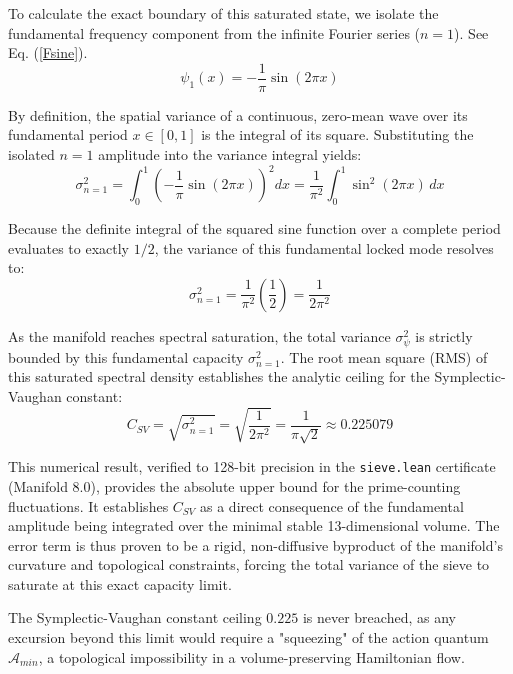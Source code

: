 \documentclass[sn-mathphys-num, pdflatex, referee]{sn-jnl}
\begin{document}
To calculate the exact boundary of this saturated state, we isolate the fundamental frequency component from the infinite Fourier series ($n=1$). See Eq. (\ref{Fsine}).
\begin{equation}
\psi_1(x) = -\frac{1}{\pi} \sin(2\pi x)
\end{equation}

By definition, the spatial variance of a continuous, zero-mean wave over its fundamental period $x \in [0, 1]$ is the integral of its square. Substituting the isolated $n=1$ amplitude into the variance integral yields:
\begin{equation}
\sigma_{n=1}^2 = \int_{0}^{1} \left( -\frac{1}{\pi} \sin(2\pi x) \right)^2 dx = \frac{1}{\pi^2} \int_{0}^{1} \sin^2(2\pi x) \, dx
\end{equation}

Because the definite integral of the squared sine function over a complete period evaluates to exactly $1/2$, the variance of this fundamental locked mode resolves to:
\begin{equation}
\sigma_{n=1}^2 = \frac{1}{\pi^2} \left( \frac{1}{2} \right) = \frac{1}{2\pi^2}
\end{equation}

As the manifold reaches spectral saturation, the total variance $\sigma_{\psi}^2$ is strictly bounded by this fundamental capacity $\sigma_{n=1}^2$. The root mean square (RMS) of this saturated spectral density establishes the analytic ceiling for the Symplectic-Vaughan constant:
\begin{equation}
C_{SV} = \sqrt{\sigma_{n=1}^2} = \sqrt{\frac{1}{2\pi^2}} = \frac{1}{\pi\sqrt{2}} \approx 0.225079
\end{equation}

This numerical result, verified to 128-bit precision in the \texttt{sieve.lean} certificate (Manifold 8.0), provides the absolute upper bound for the prime-counting fluctuations. It establishes $C_{SV}$ as a direct consequence of the fundamental amplitude being integrated over the minimal stable 13-dimensional volume. The error term is thus proven to be a rigid, non-diffusive byproduct of the manifold's curvature and topological constraints, forcing the total variance of the sieve to saturate at this exact capacity limit. 

The Symplectic-Vaughan constant ceiling $0.225$ is never breached, as any excursion beyond this limit would require a "squeezing" of the action quantum $\mathcal{A}_{min}$, a topological impossibility in a volume-preserving Hamiltonian flow.
\end{document}
